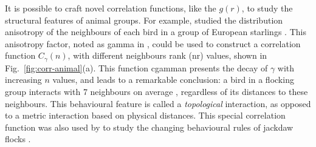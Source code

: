 \documentclass[11pt,twoside]{report}
\begin{document}
It is possible to craft novel correlation functions, like the $g(r)$, to study the structural features of animal groups. For example, \citeauthor{ballerini2008pnas} studied the distribution anisotropy of the neighbours of each bird in a group of European starlings \cite{ballerini2008pnas}. This anisotropy factor, noted as \gls{gamma} in \cite{ballerini2008pnas}, could be used to construct a correlation function $C_\gamma(n)$, with different neighbours rank (\gls{nr}) values, shown in Fig.~\ref{fig:corr-animal}(a).
This function \gls{cgamman} presents the decay of $\gamma$ with increasing $n$ values, and leads to a remarkable conclusion: a bird in a flocking group interacts with 7 neighbours on average \cite{ballerini2008pnas, cavagna2014}, regardless of its distances to these neighbours.
This behavioural feature is called a \emph{topological} interaction, as opposed to a metric interaction based on physical distances. This special correlation function was also used by \citeauthor{ling2019nc} to study the changing behavioural rules of jackdaw flocks \cite{ling2019nc}.
\end{document}
